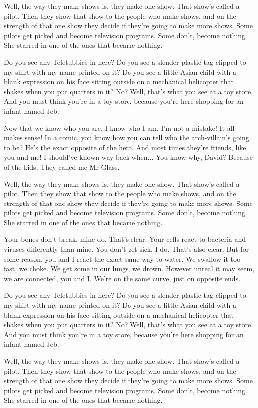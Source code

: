 \documentclass{book}
\begin{document}
Well, the way they make shows is, they make one show. That show's called a pilot. Then they show that show to the people who make shows, and on the strength of that one show they decide if they're going to make more shows. Some pilots get picked and become television programs. Some don't, become nothing. She starred in one of the ones that became nothing.

Do you see any Teletubbies in here? Do you see a slender plastic tag clipped to my shirt with my name printed on it? Do you see a little Asian child with a blank expression on his face sitting outside on a mechanical helicopter that shakes when you put quarters in it? No? Well, that's what you see at a toy store. And you must think you're in a toy store, because you're here shopping for an infant named Jeb.

Now that we know who you are, I know who I am. I'm not a mistake! It all makes sense! In a comic, you know how you can tell who the arch-villain's going to be? He's the exact opposite of the hero. And most times they're friends, like you and me! I should've known way back when... You know why, David? Because of the kids. They called me Mr Glass.

Well, the way they make shows is, they make one show. That show's called a pilot. Then they show that show to the people who make shows, and on the strength of that one show they decide if they're going to make more shows. Some pilots get picked and become television programs. Some don't, become nothing. She starred in one of the ones that became nothing.

Your bones don't break, mine do. That's clear. Your cells react to bacteria and viruses differently than mine. You don't get sick, I do. That's also clear. But for some reason, you and I react the exact same way to water. We swallow it too fast, we choke. We get some in our lungs, we drown. However unreal it may seem, we are connected, you and I. We're on the same curve, just on opposite ends.

Do you see any Teletubbies in here? Do you see a slender plastic tag clipped to my shirt with my name printed on it? Do you see a little Asian child with a blank expression on his face sitting outside on a mechanical helicopter that shakes when you put quarters in it? No? Well, that's what you see at a toy store. And you must think you're in a toy store, because you're here shopping for an infant named Jeb.

Well, the way they make shows is, they make one show. That show's called a pilot. Then they show that show to the people who make shows, and on the strength of that one show they decide if they're going to make more shows. Some pilots get picked and become television programs. Some don't, become nothing. She starred in one of the ones that became nothing.
\end{document}
